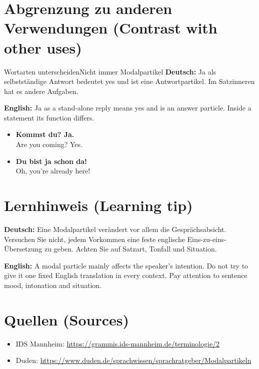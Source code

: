 \documentclass[a4paper,11pt]{article}
\newcommand{\GermanText}[1]{\textbf{Deutsch: }#1\par}
\newcommand{\EnglishText}[1]{{\small\color{SoftGray}\textbf{English: }#1\par}}
\newcommand{\ExampleItem}[2]{\item \textbf{#1}\\{\small\color{SoftGray}#2}}
\begin{document}
\section{Abgrenzung zu anderen Verwendungen \textnormal{(Contrast with other uses)}}
\begin{grammarentry}{Wortarten unterscheiden}{Nicht immer Modalpartikel}
\GermanText{Ja als selbstständige Antwort bedeutet yes und ist eine Antwortpartikel. Im Satzinneren hat es andere Aufgaben.}
\EnglishText{Ja as a stand-alone reply means yes and is an answer particle. Inside a statement its function differs.}
\end{grammarentry}
\begin{exbox}\begin{itemize}
\ExampleItem{Kommst du? Ja.}{Are you coming? Yes.}
\ExampleItem{Du bist ja schon da!}{Oh, you're already here!}
\end{itemize}\end{exbox}
\section{Lernhinweis \textnormal{(Learning tip)}}
\GermanText{Eine Modalpartikel verändert vor allem die Gesprächsabsicht. Versuchen Sie nicht, jedem Vorkommen eine feste englische Eins-zu-eins-Übersetzung zu geben. Achten Sie auf Satzart, Tonfall und Situation.}
\EnglishText{A modal particle mainly affects the speaker's intention. Do not try to give it one fixed English translation in every context. Pay attention to sentence mood, intonation and situation.}
\section{Quellen \textnormal{(Sources)}}
\begin{itemize}
\item IDS Mannheim: \url{https://grammis.ids-mannheim.de/terminologie/2}
\item Duden: \url{https://www.duden.de/sprachwissen/sprachratgeber/Modalpartikeln}
\end{itemize}
\end{document}
